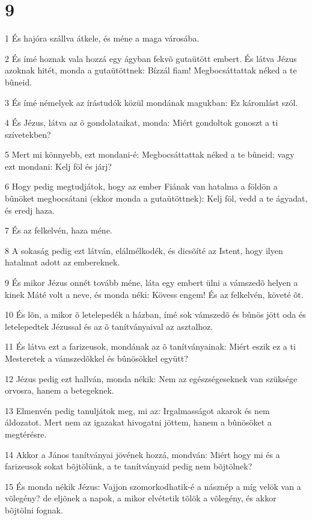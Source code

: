 \chapter{9}

\par 1 És hajóra szállva átkele, és méne a maga városába.
\par 2 És ímé hoznak vala hozzá egy ágyban fekvõ gutaütött embert. És látva Jézus azoknak hitét, monda a gutaütöttnek: Bízzál fiam! Megbocsáttattak néked a te bûneid.
\par 3 És ímé némelyek az írástudók közül mondának magukban: Ez káromlást szól.
\par 4 És Jézus, látva az õ gondolataikat, monda: Miért gondoltok gonoszt a ti szívetekben?
\par 5 Mert mi könnyebb, ezt mondani-é: Megbocsáttattak néked a te bûneid; vagy ezt mondani: Kelj föl és járj?
\par 6 Hogy pedig megtudjátok, hogy az ember Fiának van hatalma a földön a bûnöket megbocsátani (ekkor monda a gutaütöttnek): Kelj föl, vedd a te ágyadat, és eredj haza.
\par 7 És az felkelvén, haza méne.
\par 8 A sokaság pedig ezt látván, elálmélkodék, és dicsõíté az Istent, hogy ilyen hatalmat adott az embereknek.
\par 9 És mikor Jézus onnét tovább méne, láta egy embert ülni a vámszedõ helyen a kinek Máté volt a neve, és monda néki: Kövess engem! És az felkelvén, követé õt.
\par 10 És lõn, a mikor õ letelepedék a házban, ímé sok vámszedõ és bûnös jött oda és letelepedtek Jézussal és az õ tanítványaival az asztalhoz.
\par 11 És látva ezt a farizeusok, mondának az õ tanítványainak: Miért eszik ez a ti Mesteretek a vámszedõkkel és bûnösökkel együtt?
\par 12 Jézus pedig ezt hallván, monda nékik: Nem az egészségeseknek van szüksége orvosra, hanem a betegeknek.
\par 13 Elmenvén pedig tanuljátok meg, mi az: Irgalmasságot akarok és nem áldozatot. Mert nem az igazakat hivogatni jöttem,  hanem a bûnösöket a megtérésre.
\par 14 Akkor a János tanítványai jövének hozzá, mondván: Miért hogy mi és a farizeusok sokat bõjtölünk, a te tanítványaid pedig nem bõjtölnek?
\par 15 És monda nékik Jézus: Vajjon szomorkodhatik-é a násznép a míg velök van a võlegény? de eljõnek a napok, a mikor elvétetik tõlök a võlegény, és akkor bõjtölni fognak.
